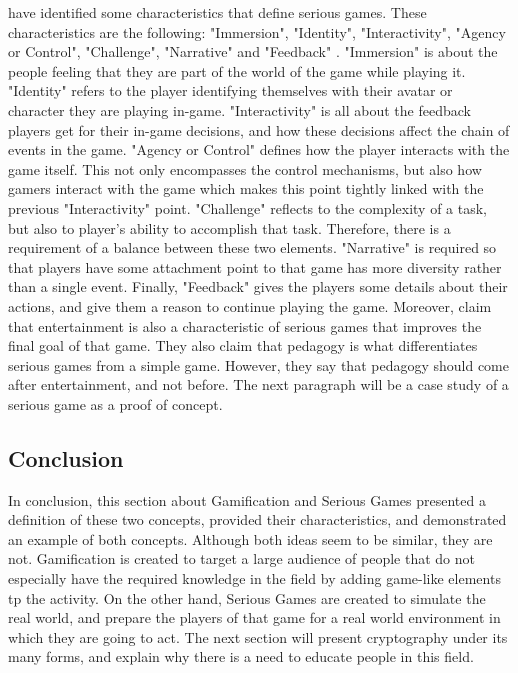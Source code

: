 \documentclass{l4proj}
\begin{document}
\citet{blumberg_serious_2012} have identified some characteristics that define serious games. These characteristics are the following: "Immersion", "Identity",
"Interactivity", "Agency or Control", "Challenge", "Narrative" and "Feedback" \citep{blumberg_serious_2012}.
"Immersion" is about the people feeling that they are part of the world of the game while playing it. 
"Identity" refers to the player identifying themselves with their avatar or character they are playing in-game.
"Interactivity" is all about the feedback players get for their in-game decisions, and how these decisions affect the chain of events in the game.
"Agency or Control" defines how the player interacts with the game itself. This not only encompasses the control mechanisms, 
but also how gamers interact with the game which makes this point tightly linked with the previous "Interactivity" point.
"Challenge" reflects to the complexity of a task, but also to player's ability to accomplish that task. Therefore, there is a requirement of a balance between these two elements.
"Narrative" is required so that players have some attachment point to that game has more diversity rather than a single event.
Finally, "Feedback" gives the players some details about their actions, and give them a reason to continue playing the game.
Moreover, \citet{susi_serious_2007} claim that entertainment is also a characteristic of serious games that improves the final goal of that game.
They also claim that pedagogy is what differentiates serious games from a simple game. However, they say that pedagogy should come after entertainment, and not before.
The next paragraph will be a case study of a serious game as a proof of concept.



\subsection{Conclusion}

In conclusion, this section about Gamification and Serious Games presented a definition of these two concepts, provided their characteristics, 
and demonstrated an example of both concepts. Although both ideas seem to be similar, they are not. 
Gamification is created to target a large audience of people that do not especially have the required knowledge in the field by adding game-like elements tp the activity.
On the other hand, Serious Games are created to simulate the real world, and prepare the players of that game for a real world environment in which they are going to act.
The next section will present cryptography under its many forms, and explain why there is a need to educate people in this field.
\end{document}
